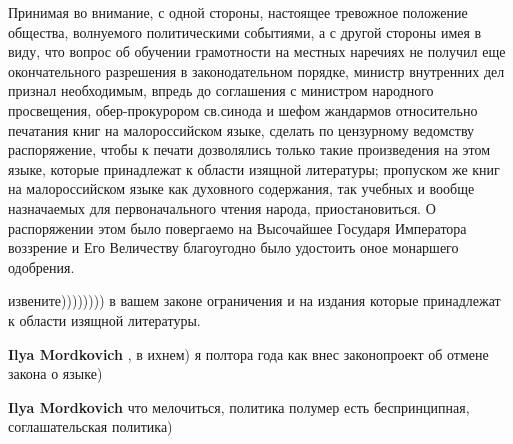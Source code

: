\begin{itemize}
Принимая во внимание, с одной стороны, настоящее тревожное положение общества,
волнуемого политическими событиями, а с другой стороны имея в виду, что вопрос
об обучении грамотности на местных наречиях не получил еще окончательного
разрешения в законодательном порядке, министр внутренних дел признал
необходимым, впредь до соглашения с министром народного просвещения,
обер-прокурором св.синода и шефом жандармов относительно печатания книг на
малороссийском языке, сделать по цензурному ведомству распоряжение, чтобы к
печати дозволялись только такие произведения на этом языке, которые принадлежат
к области изящной литературы; пропуском же книг на малороссийском языке как
духовного содержания, так учебных и вообще назначаемых для первоначального
чтения народа, приостановиться. О распоряжении этом было повергаемо на
Высочайшее Государя Императора воззрение и Его Величеству благоугодно было
удостоить оное монаршего одобрения.

 

извените)))))))) в вашем законе ограничения и на издания которые принадлежат к
области изящной литературы.

\begin{itemize}
 
\textbf{Ilya Mordkovich} , в ихнем) я полтора года как внес законопроект об отмене закона о языке)

 
\textbf{Ilya Mordkovich} что мелочиться, политика полумер есть беспринципная, соглашательская политика)

 

\end{itemize}
\end{itemize}
